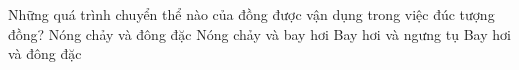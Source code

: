 

\begin{ex}
	{\color{red}\footnotesize\ttfamily [L12C1B1-TN-37]}\par %
	Những quá trình chuyển thể nào của đồng được vận dụng trong việc đúc tượng đồng?
	\choice
	{\True Nóng chảy và đông đặc}
	{Nóng chảy và bay hơi}
	{Bay hơi và ngưng tụ}
	{Bay hơi và đông đặc}
\end{ex}

